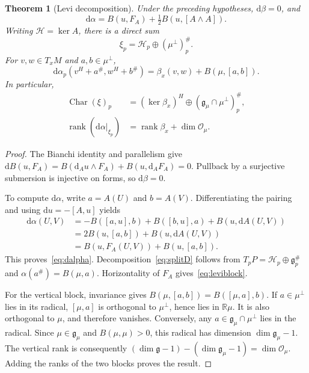\documentclass[11pt,a4paper]{article}
\numberwithin{equation}{section}
\newtheorem{theorem}{Theorem}[section]
\theoremstyle{definition}
\theoremstyle{remark}
\newcommand{\g}{\mathfrak g}
\newcommand{\D}{\xi}
\newcommand{\Horz}{\mathcal H}
\newcommand{\rank}{\operatorname{rank}}
\newcommand{\Char}{\operatorname{Char}}
\newcommand{\R}{\mathbb R}
\newcommand{\dd}{\mathrm d}
\begin{document}
\begin{theorem}[Levi decomposition]\label{thm:rank}
Under the preceding hypotheses, $\dd\beta=0$, and
\begin{equation}\label{eq:dalpha}
 \dd\alpha=B(u,F_A)+\tfrac12B(u,[A\wedge A]).
\end{equation}
Writing $\Horz=\ker A$, there is a direct sum
\begin{equation}\label{eq:splitD}
 \D_p=\Horz_p\oplus(\mu^\perp)^\#_p.
\end{equation}
For $v,w\in T_xM$ and $a,b\in\mu^\perp$,
\begin{equation}\label{eq:leviblock}
 \dd\alpha_p(v^H+a^\#,w^H+b^\#)
 =\beta_x(v,w)+B(\mu,[a,b]).
\end{equation}
In particular,
\begin{align}
 \Char(\D)_p
 &= (\ker\beta_x)^H\oplus(\g_\mu\cap\mu^\perp)^\#_p,
 \label{eq:char}\\
 \rank(\dd\alpha|_{\D_p})
 &=\rank\beta_x+\dim\mathcal O_\mu.
 \label{eq:rank}
\end{align}
\end{theorem}

\begin{proof}
The Bianchi identity and parallelism give
$\dd B(u,F_A)=B(\dd_Au\wedge F_A)+B(u,\dd_AF_A)=0$.
Pullback by a surjective submersion is injective on forms, so $\dd\beta=0$.

To compute $\dd\alpha$, write $a=A(U)$ and $b=A(V)$. Differentiating the
pairing and using $\dd u=-[A,u]$ yields
\begin{align*}
 \dd\alpha(U,V)
 &=-B([a,u],b)+B([b,u],a)+B(u,\dd A(U,V))\\
 &=2B(u,[a,b])+B(u,\dd A(U,V))\\
 &=B(u,F_A(U,V))+B(u,[a,b]).
\end{align*}
This proves~\eqref{eq:dalpha}. Decomposition~\eqref{eq:splitD} follows from
$T_pP=\Horz_p\oplus\g^\#_p$ and $\alpha(a^\#)=B(\mu,a)$.
Horizontality of $F_A$ gives~\eqref{eq:leviblock}.

For the vertical block, invariance gives
$B(\mu,[a,b])=B([\mu,a],b)$. If $a\in\mu^\perp$ lies in its radical,
$[\mu,a]$ is orthogonal to $\mu^\perp$, hence lies in $\R\mu$.
It is also orthogonal to $\mu$, and therefore vanishes. Conversely, any
$a\in\g_\mu\cap\mu^\perp$ lies in the radical. Since
$\mu\in\g_\mu$ and $B(\mu,\mu)>0$, this radical has dimension
$\dim\g_\mu-1$. The vertical rank is consequently
$(\dim\g-1)-(\dim\g_\mu-1)=\dim\mathcal O_\mu$.
Adding the ranks of the two blocks proves the result.
\end{proof}
\end{document}
